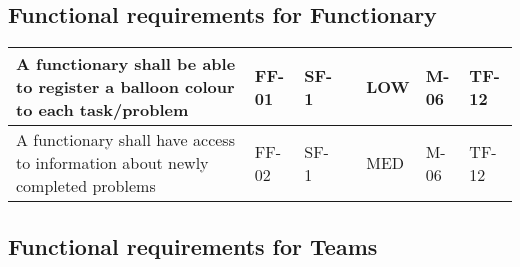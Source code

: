 \subsection{Functional requirements for Functionary}

\begin{tabular}{|m{1.1191599in}|m{0.33795986in}|m{0.33795986in}|m{1.2580599in}|m{0.5045598in}|m{1.1191599in}|m{1.0775598in}|}
\hline A functionary shall be able to register a balloon colour to each
task/problem & FF-01 & SF-1 &
 & LOW & M-06 & TF-12\\\hline A functionary shall have access to information
about newly completed problems & FF-02 & SF-1 &
 & MED & M-06 & TF-12\\\hline
\end{tabular}

\subsection{Functional requirements for Teams}
